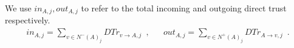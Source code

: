 \begin{definition}
\label{inouttrust}
  We use $in_{A, j}, out_{A, j}$ to refer to the total incoming and outgoing direct trust respectively.
  \begin{align}
    in_{A, j} = \sum\limits_{v \in N^{-}\left(A\right)_j}DTr_{v \rightarrow A, j} \enspace, &&
    out_{A, j} = \sum\limits_{v \in N^{+}\left(A\right)_j}DTr_{A \rightarrow v, j} \enspace.
  \end{align}
\end{definition}
